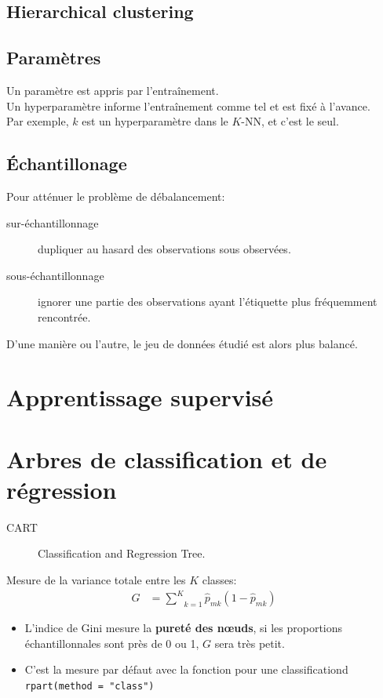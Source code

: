 \documentclass[10pt, french]{article}
\begin{document}
\begin{multicols*}{3}
\subsection*{Hierarchical clustering}

\subsection*{Paramètres}
Un paramètre est appris par l'entraînement.\\
Un hyperparamètre informe l'entraînement comme tel et est fixé à l'avance. \\
Par exemple, $k$ est un hyperparamètre dans le $K$-NN, et c'est le seul.

\subsection*{Échantillonage}
Pour atténuer le problème de débalancement:
\begin{description}
	\item[sur-échantillonnage]	dupliquer au hasard des observations sous observées.
	\item[sous-échantillonnage]	ignorer une partie des observations ayant l'étiquette plus fréquemment rencontrée.
\end{description}
D'une manière ou l'autre, le jeu de données étudié est alors plus balancé.

\pagebreak

\section{Apprentissage supervisé}
\pagebreak

\section{Arbres de classification et de régression}

\begin{description}
	\item[CART]	Classification and Regression Tree.
\end{description}

\begin{definitionNOHFILL}
Mesure de la variance totale entre les $K$ classes:
\begin{align*}
	G	
	&=	\underset{k = 1}{\overset{K}{\sum}} \hat{p}_{mk} (1 - \hat{p}_{mk})
\end{align*}
\begin{itemize}[leftmargin = *]
	\item	L'indice de Gini mesure la \textbf{pureté des nœuds}, si les proportions échantillonnales sont près de 0 ou 1, $G$ sera très petit.
	\item	C'est la mesure par défaut avec la fonction pour une classificationd \texttt{rpart(method = "class")}
\end{itemize}
\end{definitionNOHFILL}


\end{multicols*}
\end{document}
